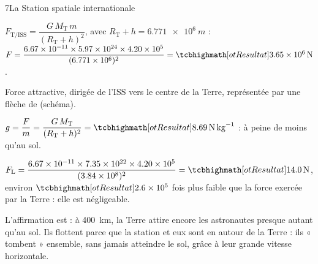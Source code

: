 

\begin{corrigeBac}{7}{La Station spatiale internationale}
\begin{questions}
\item $F_\mathrm{T/ISS}=\dfrac{G\,M_\mathrm{T}\,m}{(R_\mathrm{T}+h)^2}$, avec $R_\mathrm{T}+h=\qty{6,771e6}{m}$ :
$F=\dfrac{\num{6,67e-11}\times\num{5,97e24}\times\num{4,20e5}}{(\num{6,771e6})^2}=\res{\qty{3,65e6}{N}}$. 
\item Force attractive, dirigée de l'ISS vers le centre de la Terre, représentée par une flèche de  (schéma). \pts{1 pt}
\item $g=\dfrac{F}{m}=\dfrac{G\,M_\mathrm{T}}{(R_\mathrm{T}+h)^2}=\res{\qty{8,69}{N.kg^{-1}}}$ : à peine  de moins qu'au sol. 
\item $F_\mathrm{L}=\dfrac{\num{6,67e-11}\times\num{7,35e22}\times\num{4,20e5}}{(\num{3,84e8})^2}=\res{\qty{14,0}{N}}$, environ $\res{\num{2,6e5}}$ fois plus faible que la
force exercée par la Terre : elle est négligeable. 
\item L'affirmation est  : à \qty{400}{km}, la Terre attire encore les astronautes presque autant qu'au sol. Ils flottent
parce que la station et eux sont en  autour de la Terre : ils « tombent » ensemble, sans jamais atteindre
le sol, grâce à leur grande vitesse horizontale. 
\end{questions}
\end{corrigeBac}

